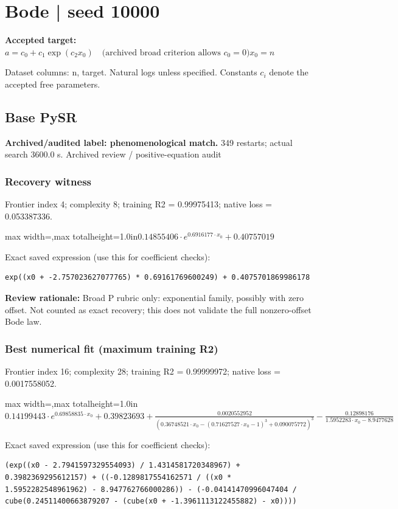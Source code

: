\documentclass[10pt,letterpaper,landscape]{article}
\begin{document}
\section*{Bode | seed 10000}
\textbf{Accepted target:} $\displaystyle a=c_0+c_1\exp(c_2x_0)\quad\text{(archived broad criterion allows }c_0=0\text{)}$\hfill $x_0=n$\par
{\small Dataset columns: n, target. Natural logs unless specified. Constants $c_i$ denote the accepted free parameters.}\par\medskip
\begin{minipage}[t]{0.485\textwidth}
\subsection*{Base PySR}
\textbf{Archived/audited label: phenomenological match.} 349 restarts; actual search 3600.0 s.
{\small Archived review / positive-equation audit}
\subsubsection*{Recovery witness}
Frontier index 4; complexity 8; training R2 = 0.99975413; native loss = 0.053387336.
\begin{center}\begin{adjustbox}{max width=\linewidth,max totalheight=1.0in}$\displaystyle 0.14855406 \cdot e^{0.6916177 \cdot x_{0}} + 0.40757019$\end{adjustbox}\end{center}
{\scriptsize Exact saved expression (use this for coefficient checks):}
\begin{lstlisting}
exp((x0 + -2.757023627077765) * 0.69161769600249) + 0.4075701869986178
\end{lstlisting}
{\small\textbf{Review rationale:} Broad P rubric only: exponential family, possibly with zero offset. Not counted as exact recovery; this does not validate the full nonzero-offset Bode law.}
\subsubsection*{Best numerical fit (maximum training R2)}
Frontier index 16; complexity 28; training R2 = 0.99999972; native loss = 0.0017558052.
\begin{center}\begin{adjustbox}{max width=\linewidth,max totalheight=1.0in}$\displaystyle 0.14199443 \cdot e^{0.69858835 \cdot x_{0}} + 0.39823693 + \frac{0.0020552952}{\left(0.36748521 \cdot x_{0} - \left(0.71627527 \cdot x_{0} - 1\right)^{3} + 0.090075772\right)^{3}} - \frac{0.12898176}{1.5952283 \cdot x_{0} - 8.9477628}$\end{adjustbox}\end{center}
{\scriptsize Exact saved expression (use this for coefficient checks):}
\begin{lstlisting}
(exp((x0 - 2.7941597329554093) / 1.4314581720348967) + 0.3982369295612157) + ((-0.1289817554162571 / ((x0 * 1.5952282548961962) - 8.947762766000286)) - (-0.04141470996047404 / cube(0.24511400663879207 - (cube(x0 + -1.3961113122455882) - x0))))
\end{lstlisting}
\end{minipage}\hfill
\end{document}
